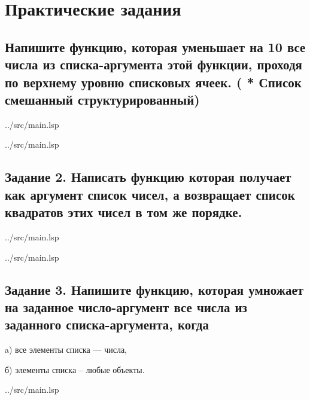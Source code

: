 \chapter{Практические задания}

\section*{Напишите функцию, которая уменьшает на 10 все числа из списка-аргумента этой функции, проходя по верхнему уровню списковых ячеек. ( * Список смешанный структурированный)}

\begin{lstinputlisting}[
	caption={Задание 1, mapcar},
	label={lst:t1-1},
	style={lsp},
	linerange={1-7},
	]{../src/main.lsp}
\end{lstinputlisting}

\begin{lstinputlisting}[
	caption={Задание 1, mapcan},
	label={lst:t1-2},
	style={lsp},
	linerange={10-18},
	]{../src/main.lsp}
\end{lstinputlisting}

\section*{Задание 2. Написать функцию которая получает как аргумент список чисел, а возвращает список квадратов этих чисел в том же порядке.}

\begin{lstinputlisting}[
	caption={Задание 2, mapcar},
	label={lst:t2-1},
	style={lsp},
	linerange={20-24},
	]{../src/main.lsp}
\end{lstinputlisting}

\begin{lstinputlisting}[
	caption={Задание 2, mapcan},
	label={lst:t2-2},
	style={lsp},
	linerange={26-30},
	]{../src/main.lsp}
\end{lstinputlisting}

\section*{Задание 3.  Напишите функцию, которая умножает на заданное число-аргумент все числа из заданного списка-аргумента, когда}
a) все элементы списка --- числа,

б) элементы списка -- любые объекты.

\begin{lstinputlisting}[
	caption={Задание 3, a, mapcar, mapcon},
	label={lst:t3-1},
	style={lsp},
	linerange={32-42},
	]{../src/main.lsp}
\end{lstinputlisting}

